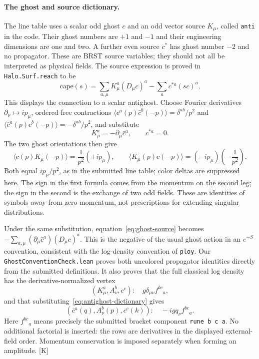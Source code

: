 \documentclass[11pt]{article}
\newcommand{\code}[1]{{\small\nolinkurl{#1}}}
\newcommand{\src}[1]{\textsf{[#1]}}
\begin{document}
\paragraph{The ghost and source dictionary.}
The line table uses a scalar odd ghost $c$ and an odd vector source
$K_\mu$, called \code{anti} in the code. Their ghost numbers are $+1$
and $-1$ and their engineering dimensions are one and two. A further
even source $c^*$ has ghost number $-2$ and no propagator. These are
BRST source variables; they should not all be interpreted as physical
fields. The source expression is proved in \code{Halo.Surf.reach} to be
\begin{equation}\label{eq:ghost-source}
 \mathrm{cape}(s)=\sum_{a,\mu}K^a_\mu(D_\mu c)^a
                         -\sum_a c^{*a}(sc)^a.
\end{equation}
This displays the connection to a scalar antighost. Choose Fourier
derivatives $\partial_\mu\mapsto ip_\mu$, ordered free contractions
$\langle c^a(p)\bar c^b(-p)\rangle=\delta^{ab}/p^2$ and
$\langle\bar c^a(p)c^b(-p)\rangle=-\delta^{ab}/p^2$, and substitute
\begin{equation}\label{eq:antighost-dictionary}
 K^a_\mu=-\partial_\mu\bar c^a,\qquad c^{*a}=0.
\end{equation}
The two ghost orientations then give
\[
 \langle c(p)K_\mu(-p)\rangle
   =\frac{1}{p^2}(+ip_\mu),\qquad
 \langle K_\mu(p)c(-p)\rangle
   =(-ip_\mu)\left(-\frac{1}{p^2}\right).
\]
Both equal $ip_\mu/p^2$, as in the submitted line table; color deltas
are suppressed here. The sign in the first formula comes from the
momentum on the second leg; the sign in the second is the exchange of
two odd fields. These are identities of symbols away from zero momentum,
not prescriptions for extending singular distributions.

Under the same substitution, equation~\eqref{eq:ghost-source} becomes
$-\sum_{a,\mu}(\partial_\mu\bar c^a)(D_\mu c)^a$. This is the negative
of the usual ghost action in an $e^{-S}$ convention, consistent with
the log-density convention of \code{ploy}. Our
\code{GhostConventionCheck.lean} proves both uncolored propagator
identities directly from the submitted definitions. It also proves that
the full classical log density has the derivative-normalized vertex
\[
 (K^a_\mu,A^b_\nu,c^c):\quad
       g\delta_{\mu\nu}f^{bc}{}_{a},
\]
and that substituting~\eqref{eq:antighost-dictionary} gives
\begin{equation}\label{eq:ghost-vertex-audit}
 (\bar c^a(q),A^b_\nu(p),c^c(k)):\quad
       -igq_\nu f^{bc}{}_{a}.
\end{equation}
Here $f^{bc}{}_{a}$ means precisely the submitted bracket component
\code{rune b c a}. No additional factorial is inserted: the rows are
derivatives in the displayed external-field order. Momentum conservation
is imposed separately when forming an amplitude. \src{K}
\end{document}

